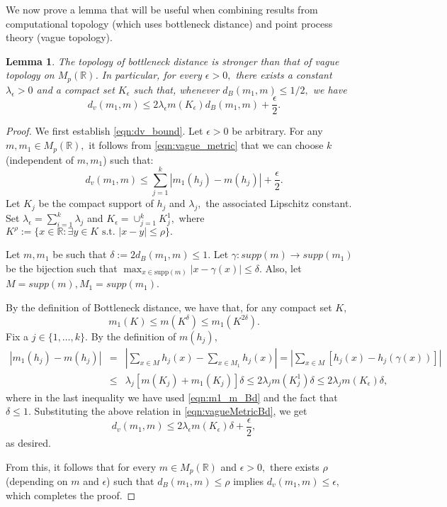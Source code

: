\documentclass[12pt]{amsart}
\newtheorem{lemma}[theorem]{Lemma}
\numberwithin{equation}{section}
\numberwithin{theorem}{section}
\newcommand{\be}{\begin{equation}}
\newcommand{\ee}{\end{equation}}
\newcommand{\Real}{\mathbb R}
\newcommand{\1}{\mathbf{1}}
\def\bR{\mathbb{R}}
\def\supp{\mathrm{supp}}
\begin{document}
We now prove a lemma that will be useful when combining results from computational topology (which uses bottleneck distance) and point process theory (vague topology).
%						
\begin{lemma}
\label{lem:DB-Vague}
The topology of bottleneck distance is stronger than that of vague topology on $M_p(\bR)$. In particular, for every $\epsilon > 0,$ there exists a constant $\lambda_\epsilon > 0$ and a compact set $K_{\epsilon}$ such that, whenever $d_B(m_1, m) \leq 1/2,$ we have
%
\be
\label{eqn:dv_bound}
d_v(m_1,m) \leq 2\lambda_\epsilon m(K_{\epsilon}) d_B(m_1, m) + \frac{\epsilon}{2}.
\ee
\end{lemma}
%
\begin{proof}
%
We first establish \eqref{eqn:dv_bound}. Let $\epsilon > 0$ be arbitrary. For any $m, m_1 \in M_p(\bR),$ it follows from \eqref{eqn:vague_metric} that we can choose $k$ (independent of $m, m_1$) such that:%
%
\be
\label{eqn:vagueMetricBd}
d_v(m_1,m) \leq \sum_{j=1}^k|m_1(h_j)-m(h_j)| + \frac{\epsilon}{2}.
\ee
%
Let $K_j$ be the compact support of $h_j$ and $\lambda_j,$ the associated Lipschitz constant. Set $\lambda_\epsilon = \sum_{i = 1}^{k} \lambda_j$ and $K_\epsilon = \cup_{j=1}^k K_j^1,$ where $K^{\rho} := \{x \in \Real: \exists y \in K \text{ s.t. } |x - y| \leq \rho\}.$

Let $m, m_1$ be such that $\delta := 2d_B(m_1, m) \leq 1.$ Let $\gamma : supp(m) \to supp(m_1)$ be the bijection such that $\max_{x \in \supp(m)}|x -\gamma(x)| \leq \delta$. Also, let $M = supp(m), M_1 = supp(m_1)$.

By the definition of Bottleneck distance, we have that, for any compact set $K,$
%
\be
\label{eqn:m1_m_Bd}
m_1(K) \leq m(K^{\delta}) \leq m_1(K^{2\delta}).
\ee
%
Fix a $j \in \{1, \ldots, k\}.$ By the definition of $m(h_j),$
%
\begin{eqnarray*}
|m_1(h_j) - m(h_j)|
&  =  &  |\sum_{x \in M}h_j(x) - \sum_{x \in M_1}h_j(x)|  = |\sum_{x \in M} [h_j(x) - h_j(\gamma(x))]| \\
& \leq & \lambda_j [m(K_j) + m_1(K_j)] \delta \leq 2\lambda_j m(K_j^1)\delta \leq 2 \lambda_j m(K_\epsilon) \delta,
\end{eqnarray*}
%
where in the last inequality we have used \eqref{eqn:m1_m_Bd} and the fact that $\delta \leq 1$. Substituting the above relation in \eqref{eqn:vagueMetricBd}, we get
%
%
\[
d_v(m_1,m) \leq 2\lambda_\epsilon m(K_{\epsilon}) \delta + \frac{\epsilon}{2},
\]
%
as desired.

From this, it follows that for every $m \in M_p(\bR)$ and $\epsilon > 0,$ there exists $\rho$ (depending on $m$ and $\epsilon$) such that $d_B(m_1, m) \leq \rho$ implies $d_v(m_1, m) \leq \epsilon,$ which completes the proof.
\end{proof}
\end{document}
